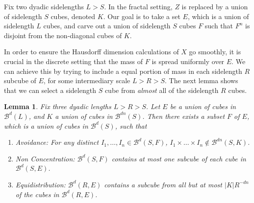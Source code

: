 \documentclass{article}
\theoremstyle{plain}
\newtheorem{lemma}{Lemma}
\theoremstyle{plain}
\begin{document}
Fix two dyadic sidelengths $L > S$. In the fractal setting, $Z$ is replaced by a union of sidelength $S$ cubes, denoted $K$. Our goal is to take a set $E$, which is a union of sidelength $L$ cubes, and carve out a union of sidelength $S$ cubes $F$ such that $F^n$ is disjoint from the non-diagonal cubes of $K$.

In order to ensure the Hausdorff dimension calculations of $X$ go smoothly, it is crucial in the discrete setting that the mass of $F$ is spread uniformly over $E$. We can achieve this by trying to include a equal portion of mass in each sidelength $R$ subcube of $E$, for some intermediary scale $L > R > S$. The next lemma shows that we can select a sidelength $S$ cube from {\it almost} all of the sidelength $R$ cubes.

\begin{lemma}
	Fix three dyadic lengths $L > R > S$. Let $E$ be a union of cubes in $\mathcal{B}^d(L)$, and $K$ a union of cubes in $\mathcal{B}^{dn}(S)$. Then there exists a subset $F$ of $E$, which is a union of cubes in $\mathcal{B}^d(S)$, such that
	\begin{enumerate}
		\item[(a)] \emph{Avoidance:}  For any distinct $I_1, \dots, I_n \in \mathcal{B}^d(S,F)$, $I_1 \times \dots \times I_n \not \in \mathcal{B}^{dn}(S,K)$.
		\item[(b)] \emph{Non Concentration:} $\mathcal{B}^d(S,F)$ contains at most one subcube of each cube in $\mathcal{B}^d(S,E)$.
		\item[(c)] \emph{Equidistribution:} $\mathcal{B}^d(R,E)$ contains a subcube from all but at most $|K| R^{-dn}$ of the cubes in $\mathcal{B}^d(R,E)$.
	\end{enumerate}

\end{lemma}
\end{document}
